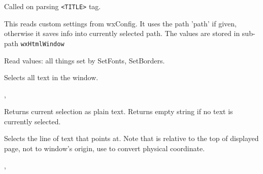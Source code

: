 \label{wxhtmlwindowonsettitle}


Called on parsing {\tt <TITLE>} tag.


\label{wxhtmlwindowreadcustomization}


This reads custom settings from wxConfig. It uses the path 'path'
if given, otherwise it saves info into currently selected path.
The values are stored in sub-path {\tt wxHtmlWindow}

Read values: all things set by SetFonts, SetBorders.




\label{wxhtmlwindowselectall}


Selects all text in the window.


,

\label{wxhtmlwindowselectiontotext}


Returns current selection as plain text. Returns empty string if no text
is currently selected.

\label{wxhtmlwindowselectline}


Selects the line of text that  points at. Note that 
is relative to the top of displayed page, not to window's origin, use
to convert physical coordinate.


,


